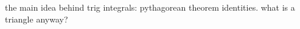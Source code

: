 \documentclass{article}
\begin{document}
the main idea behind trig integrals: pythagorean theorem identities. what is a
triangle anyway?
\end{document}

